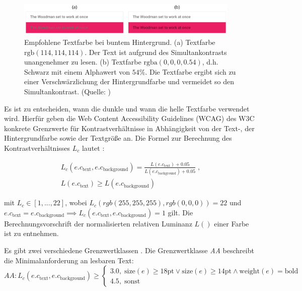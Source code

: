 \begin{figure}[h]
	\centering
	\includegraphics[width=0.95\textwidth]{img/text_color.png}
	\caption{Empfohlene Textfarbe bei buntem Hintergrund. (a) Textfarbe $\text{rgb}(114,114,114)$. Der Text ist aufgrund des Simultankontrasts unangenehmer zu lesen. (b) Textfarbe $\text{rgba}(0, 0, 0, 0.54)$, d.h. Schwarz mit einem Alphawert  von $54\%$. Die Textfarbe ergibt sich zu einer Verschwärzlichung der Hintergrundfarbe und vermeidet so den Simultankontrast. (Quelle: \citep{google})}
	\label{fig:text_color}
\end{figure}

Es ist zu entscheiden, wann die dunkle und wann die helle Textfarbe verwendet wird. Hierfür geben die Web Content Accessibility Guidelines (WCAG) des W3C konkrete Grenzwerte für Kontrastverhältnisse in Abhängigkeit von der Text-, der Hintergrundfarbe sowie der Textgröße an. Die Formel zur Berechnung des Kontrastverhältnisses $L_c$ lautet \citep{wcag-contrast}:

\begin{equation}
	\begin{split}
		L_c(e.c_\text{text}, e.c_\text{background}) = \frac{L(e.c_\text{text}) + 0.05}{L(e.c_\text{background}) + 0.05} \;,\\
		L(e.c_\text{text}) \geq L(e.c_\text{background})
	\end{split}
\end{equation}

mit $L_c \in [1, ... , 22]$, wobei $L_c(rgb(255, 255, 255), rgb(0, 0, 0)) = 22$ und $e.c_\text{text} = e.c_\text{background} \implies L_c(e.c_\text{text}, e.c_\text{background}) = 1$ gilt. Die Berechnungsvorschrift der normalisierten relativen Luminanz $L()$ einer Farbe ist \citep{wcag-rel-luminance} zu entnehmen.

Es gibt zwei verschiedene Grenzwertklassen \citep{wcag}. Die Grenzwertklasse \emph{AA} beschreibt die Minimalanforderung an lesbaren Text:
\begin{equation}
  	AA: L_c(e.c_\text{text}, e.c_\text{background}) \geq
	\begin{cases}
	3.0, \; \text{size}(e) \geq 18\text{pt} \lor \text{size}(e) \geq 14\text{pt} \land \text{weight}(e) = \text{bold}\\
		4.5,  \;  \text{sonst}
	\end{cases}
\end{equation}

